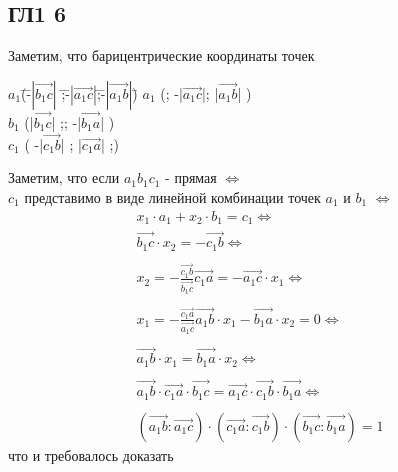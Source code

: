 	\subsection{ГЛ1 6}
		 		
		 Заметим, что барицентрические координаты точек\\
		 \begin{tabbing}
		 	$a_1$\= (\=-$|\overrightarrow{b_1 c}|$ \= ;\= -$|\overrightarrow{a_1 c}|$\=;\=-$|\overrightarrow{a_1 b}|$\=) \kill
		 	$a_1$\> (\>;\> -|$\overrightarrow{a_1 c}$|\>;\> |$\overrightarrow{a_1 b}$| \>)\\
		 	$b_1$\> (\>|$\overrightarrow{b_1 c}$| \> ;\>;\> -|$\overrightarrow{b_1 a}$| \>)\\
		 	$c_1$\> (\> -|$\overrightarrow{c_1 b}$| \> ;\> |$\overrightarrow{c_1 a}$| \>;\>0\>)\\
		\end{tabbing}	 	
		Заметим, что если $a_1 b_1 c_1$ - прямая $\Leftrightarrow$ 
		\\$c_1$ представимо в виде линейной комбинации точек $a_1$ и $b_1$ $\Leftrightarrow$ 
		\begin{gather*}
		x_1 \cdot a_1 + x_2 \cdot b_1 = c_1 \Leftrightarrow\\
		\overrightarrow{b_1 c} \cdot x_2 = -\overrightarrow{c_1 b}\Leftrightarrow\\\\
		x_2 = -\frac{\overrightarrow{c_1 b} }{\overrightarrow{b_1 c} } 
		\overrightarrow{c_1 a} = -\overrightarrow{a_1 c} \cdot x_1 \Leftrightarrow\\\\
		x_1 = -\frac{\overrightarrow{c_1 a} }{\overrightarrow{a_1 c} }
		\overrightarrow{a_1 b} \cdot x_1 - \overrightarrow{b_1 a} \cdot x_2 = 0 \Leftrightarrow\\\\
		\overrightarrow{a_1 b} \cdot x_1 = \overrightarrow{b_1 a} \cdot x_2 \Leftrightarrow\\\\
		\overrightarrow{a_1 b} \cdot \overrightarrow{c_1 a} \cdot \overrightarrow{b_1 c} = \overrightarrow{a_1 c} \cdot \overrightarrow{c_1 b} \cdot \overrightarrow{b_1 a} \Leftrightarrow\\\\
		(\overrightarrow{a_1 b}:\overrightarrow{a_1 c}) \cdot (\overrightarrow{c_1 a}:\overrightarrow{c_1 b}) \cdot (\overrightarrow{b_1 c}:\overrightarrow{b_1 a}) = 1
		\end{gather*} 
		что и требовалось доказать 

